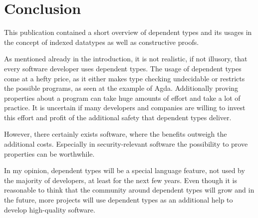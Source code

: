 \section{Conclusion}
This publication contained a short overview of dependent types and its usages in the concept of indexed datatypes as well as constructive proofs.

As mentioned already in the introduction, it is not realistic, if not illusory, that every software developer uses dependent types. 
The usage of dependent types come at a hefty price, as it either makes type checking undecidable or restricts the possible programs, as seen at the example of Agda.
Additionally proving properties about a program can take huge amounts of effort and take a lot of practice.
It is uncertain if many developers and companies are willing to invest this effort and profit of the additional safety that dependent types deliver.

However, there certainly exists software, where the benefits outweigh the additional costs. 
Especially in security-relevant software the possibility to prove properties can be worthwhile.

In my opinion, dependent types will be a special language feature, not used by the majority of developers, at least for the next few years. 
Even though it is reasonable to think that the community around dependent types will grow and in the future, more projects will use dependent types as an additional help to develop high-quality software.